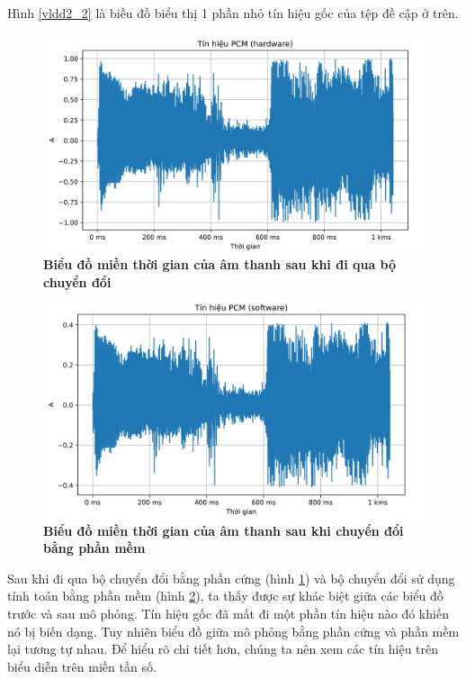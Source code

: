 Hình \ref{vldd2_2} là biều đồ biểu thị 1 phần nhỏ tín hiệu gốc của tệp đề cập ở trên. 
\begin{figure}[H]
    \centering
    \includegraphics[width=14cm]{Images/Chuong4/tb/wav/vldd2_0.png}
    \caption[Biểu đồ miền thời gian của âm thanh sau khi đi qua bộ chuyển đổi]{\bfseries \fontsize{12pt}{0pt}\selectfont  Biểu đồ miền thời gian của âm thanh sau khi đi qua bộ chuyển đổi }
    \label{vldd2_0}
\end{figure}

\begin{figure}[H]
    \centering
    \includegraphics[width=14cm]{Images/Chuong4/tb/wav/vldd2_1.png}
    \caption[Biểu đồ miền thời gian của âm thanh sau khi chuyển đổi bằng phần mềm]{\bfseries \fontsize{12pt}{0pt}\selectfont  Biểu đồ miền thời gian của âm thanh sau khi chuyển đổi bằng phần mềm}
    \label{vldd2_1}
\end{figure}
Sau khi đi qua bộ chuyển đổi bằng phần cứng (hình \ref{vldd2_0}) và bộ chuyển đổi sử dụng tính toán bằng phần mềm (hình \ref{vldd2_1}), ta thấy được sự khác biệt giữa các biểu đồ trước và sau mô phỏng. Tín hiệu gốc đã mất đi một phần tín hiệu nào đó khiến nó bị biến dạng. Tuy nhiên biểu đồ giữa mô phỏng bằng phần cứng và phần mềm lại tương tự nhau. Để hiểu rõ chi tiết hơn, chúng ta nên xem các tín hiệu trên biểu diễn trên miền tần số.

